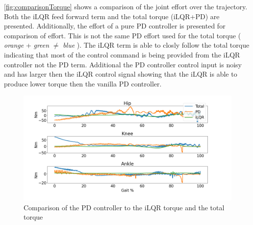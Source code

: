 \autoref{fig:comparisonTorque} shows a comparison of the joint effort over the trajectory. Both the iLQR feed forward term and the total torque (iLQR+PD) are presented. Additionally, the effort of a pure PD controller is presented for comparison of effort. This is not the same PD effort used for the total torque ( \textit{orange} +  \textit{green} $\neq$  \textit{blue} ). The iLQR term is able to closly follow the total torque indicating that most of the control command is being provided from the iLQR controller not the PD term. Additional the PD controller control input is noisy and has larger then the iLQR control signal showing that the iLQR is able to produce lower torque then the vanilla PD controller. 

\begin{figure}
    \centering
    \includegraphics[scale=0.35]{images/controllers/torque_compare.png}
    \caption[Torque Comparison of the iLQR controller]{Comparison of the PD controller to the iLQR torque and the total torque}
    \label{fig:comparisonTorque}
\end{figure}
